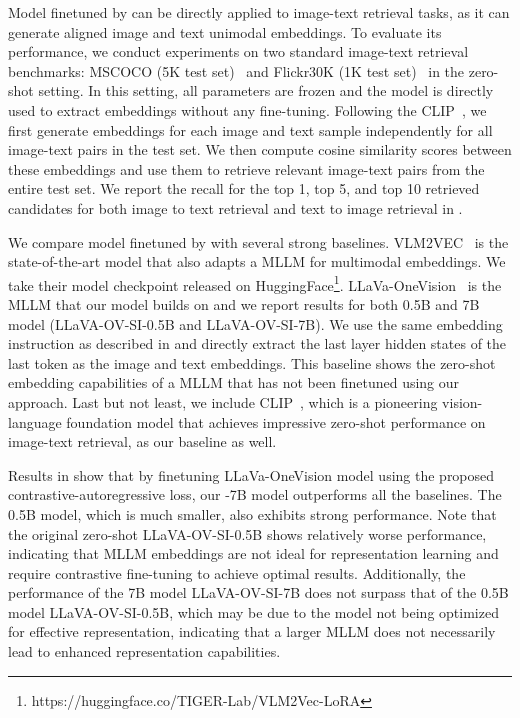 %
Model finetuned by \algname can be directly applied to image-text retrieval tasks, as it can generate aligned image and text unimodal embeddings. 
%
To evaluate its performance, we conduct experiments on two standard image-text retrieval benchmarks: MSCOCO (5K test set)~\citep{Chen2015MicrosoftCC} and Flickr30K (1K test set)~\citep{flickrentitiesijcv} in the zero-shot setting. 
%
In this setting, all parameters are frozen and the model is directly used to extract embeddings without any fine-tuning. 
%
Following the CLIP~\citep{radford2021learning}, we first generate embeddings for each image and text sample independently for all image-text pairs in the test set. 
%
We then compute cosine similarity scores between these embeddings and use them to retrieve relevant image-text pairs from the entire test set. 
%
We report the recall for the top 1, top 5, and top 10 retrieved candidates for both image to text retrieval and text to image retrieval in . 
%

We compare model finetuned by \algname with several strong baselines. 
%
VLM2VEC~\citep{jiang2024vlm2vec} is the state-of-the-art model that also adapts a MLLM for multimodal embeddings. 
%
We take their model checkpoint released on HuggingFace\footnote{https://huggingface.co/TIGER-Lab/VLM2Vec-LoRA}. 
%
LLaVa-OneVision~\citep{li2024llava} is the MLLM that our model builds on and we report results for both 0.5B and 7B model (LLaVA-OV-SI-0.5B and LLaVA-OV-SI-7B). 
%
We use the same embedding instruction as described in  and directly extract the last layer hidden states of the last token as the image and text embeddings. 
%
This baseline shows the zero-shot embedding capabilities of a MLLM that has not been finetuned using our approach. 
%
Last but not least, we include CLIP~\citep{radford2021learning}, which is a pioneering vision-language foundation model that achieves impressive zero-shot performance on image-text retrieval, as our baseline as well. 
%


Results in  show that by finetuning LLaVa-OneVision model using the proposed contrastive-autoregressive loss, our \algname-7B model outperforms all the baselines. 
%
The 0.5B model, which is much smaller, also exhibits strong performance. 
%
Note that the original zero-shot LLaVA-OV-SI-0.5B shows relatively worse performance, indicating that MLLM embeddings are not ideal for representation learning and require contrastive fine-tuning to achieve optimal results. 
%
Additionally, the performance of the 7B model LLaVA-OV-SI-7B does not surpass that of the 0.5B model LLaVA-OV-SI-0.5B, which may be due to the model not being optimized for effective representation, indicating that a larger MLLM does not necessarily lead to enhanced representation capabilities.
%

